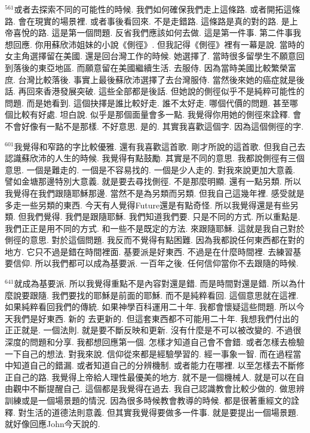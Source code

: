 \documentclass{book}
\begin{document}
$^{561}$或者去探索不同的可能性的時候.
我們如何確保我們走上這條路.
或者開拓這條路.
會在現實的場景裡.
或者事後看回來.
不是走錯路.
這條路是真的對的路.
是上帝喜悅的路.
這是第一個問題.
反省我們應該如何去做.
這是第一件事.
第二件事我想回應.
你用蘇欣沛姐妹的小說《側徑》.
但我記得《側徑》裡有一幕是說.
當時的女主角選擇留在美國.
還是回台灣工作的時候.
她選擇了.
當時很多留學生不願意回到落後的東亞地區.
而願意留在美國繼續生活.
去服侍.
因為當時美國比較繁榮富庶.
台灣比較落後.
事實上最後蘇欣沛選擇了去台灣服侍.
當然後來她的癌症就是後話.
再回來香港發展突破.
這些全部都是後話.
但她說的側徑似乎不是純粹可能性的問題.
而是她看到.
這個抉擇是誰比較好走.
誰不太好走.
哪個代價的問題.
甚至哪個比較有好處.
坦白說.
似乎是那個面量會多一點.
我覺得你用她的側徑來詮釋.
會不會好像有一點不是那樣.
不好意思.
是的.
其實我喜歡這個字.
因為這個側徑的字.

$^{601}$我覺得和窄路的字比較優雅.
還有我喜歡這首歌.
剛才所說的這首歌.
但我自己去認識蘇欣沛的人生的時候.
我覺得有點鼓勵.
其實是不同的意思.
我都說側徑有三個意思.
一個是難走的.
一個是不容易找的.
一個是少人走的.
對我來說更加大意義.
譬如金塘那邊特別大意義.
就是要去尋找側徑.
不是那麼明顯.
還有一點另類.
所以我覺得在我們跟隨耶穌那邊.
當然不是為另類而另類.
但我自己這幾年裡.
感受就是多走一些另類的東西.
今天有人覺得Future還是有點奇怪.
所以我覺得還是有些另類.
但我們覺得.
我們是跟隨耶穌.
我們知道我們要.
只是不同的方式.
所以重點是.
我們正正是用不同的方式.
和一些不是既定的方法.
來跟隨耶穌.
這就是我自己對於側徑的意思.
對於這個問題.
我反而不覺得有點困難.
因為我都說任何東西都在對的地方.
它只不過是錯在時間裡面.
基要派是好東西.
不過是在什麼時間裡.
去練習基要信仰.
所以我們都可以成為基要派.
一百年之後.
任何信仰當你不去跟隨的時候.

$^{641}$就成為基要派.
所以我覺得重點不是內容對還是錯.
而是時間對還是錯.
所以為什麼說要跟隨.
我們要找的耶穌是前面的耶穌.
而不是純粹看回.
這個意思就在這裡.
如果純粹看回我們的傳統.
如果神學百科運用二十年.
我都會懷疑這些問題.
所以今天我們是好東西.
新的 去更新的.
但這套東西都不可能用二十年.
我想我們付出的正正就是.
一個法則.
就是要不斷反映和更新.
沒有什麼是不可以被改變的.
不過很深度的問題和分享.
我都想回應第一個.
怎樣才知道自己會不會錯.
或者怎樣去檢驗一下自己的想法.
對我來說.
信仰從來都是經驗學習的.
經一事象一智.
而在過程當中知道自己的錯漏.
或者知道自己的分辨機制.
或者能力在哪裡.
以至怎樣去不斷修正自己的路.
我覺得上帝給人理性最優美的地方.
就不是一個機械人.
就是可以在自由觀中不斷提醒自己.
這個都是我覺得在過去.
我自己認識教會比較少做的.
做思辨訓練或是一個場景題的情況.
因為很多時候教會教導的時候.
都是很著重經文的詮釋.
對生活的道德法則意義.
但其實我覺得要做多一件事.
就是要提出一個場景題.
就好像回應John今天說的.
\end{document}
